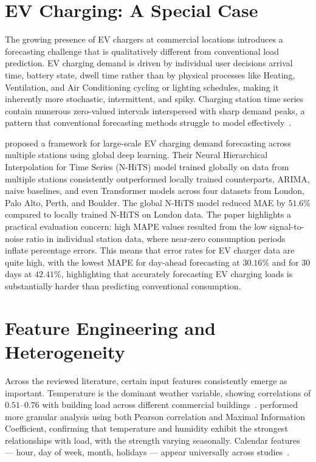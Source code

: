 \section{EV Charging: A Special Case}
\label{sec:ev_charging}

The growing presence of EV chargers at commercial locations introduces a forecasting
challenge that is qualitatively different from conventional load prediction. EV charging
demand is driven by individual user decisions arrival time, battery state, dwell time
 rather than by physical processes like Heating, Ventilation, and Air Conditioning cycling or lighting schedules, making it
inherently more stochastic, intermittent, and spiky. Charging station time series contain
numerous zero-valued intervals interspersed with sharp demand peaks, a pattern that
conventional forecasting methods struggle to model effectively~\cite{tang2024,
koohfar2023}.

\citet{vanetten2024} proposed a framework for large-scale EV charging demand forecasting
across multiple stations using global deep learning. Their Neural Hierarchical Interpolation for Time Series (N-HiTS) model trained globally
on data from multiple stations consistently outperformed locally trained counterparts,
ARIMA, naive baselines, and even Transformer models across four datasets from London,
Palo Alto, Perth, and Boulder. The global N-HiTS model reduced MAE by $51.6\%$ compared
to locally trained N-HiTS on London data. The paper highlights a practical evaluation
concern: high MAPE values resulted from the low signal-to-noise ratio in individual
station data, where near-zero consumption periods inflate percentage errors. This means
that error rates for EV charger data are quite high, with the lowest MAPE for day-ahead
forecasting at $30.16\%$ and for 30 days at $42.41\%$, highlighting that accurately
forecasting EV charging loads is substantially harder than predicting conventional
consumption.

\section{Feature Engineering and Heterogeneity}
\label{sec:feature_engineering_literature}

Across the reviewed literature, certain input features consistently emerge as important.
Temperature is the dominant weather variable, showing correlations of $0.51$--$0.76$
with building load across different commercial buildings~\cite{cai2019}.
\citet{tian2025} performed more granular analysis using both Pearson correlation and
Maximal Information Coefficient, confirming that temperature and humidity exhibit the
strongest relationships with load, with the strength varying seasonally. Calendar
features --- hour, day of week, month, holidays --- appear universally across
studies~\cite{sinitsyn2023, ye2024, moveh2025a}.

